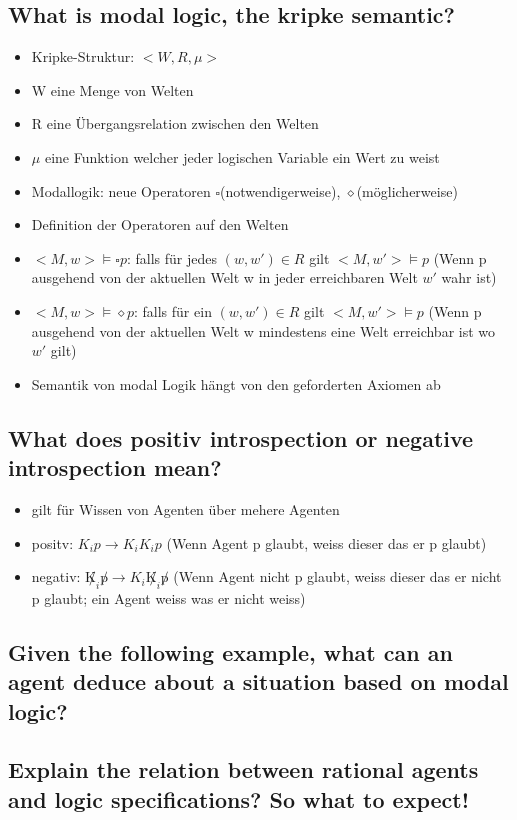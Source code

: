 \subsection{What is modal logic, the kripke semantic?}
\begin{itemize}
	\item Kripke-Struktur: $<W,R,\mu>$
	\item W eine Menge von Welten
	\item R eine Übergangsrelation zwischen den Welten
	\item $\mu$ eine Funktion welcher jeder logischen Variable ein Wert zu weist
	\item Modallogik: neue Operatoren $\square$(notwendigerweise), $\diamond$(möglicherweise)
	\item Definition der Operatoren auf den Welten
	\item $<M,w>\vDash\square p$: falls für jedes $(w,w') \in R$ gilt $<M,w'> \vDash p$ (Wenn p ausgehend von der aktuellen Welt w  in jeder erreichbaren Welt $w'$ wahr ist)
	\item $<M,w>\vDash\diamond p$: falls für ein $(w,w') \in R$ gilt $<M,w'> \vDash p$ (Wenn p ausgehend von der aktuellen Welt w mindestens eine Welt erreichbar ist wo $w'$ gilt)
	\item Semantik von modal Logik hängt von den geforderten Axiomen ab
	\end{itemize}
\subsection{What does positiv introspection or negative introspection mean?}
\begin{itemize}
	\item gilt für Wissen von Agenten über mehere Agenten
	\item positv: $K_i p \rightarrow K_i K_i p$ (Wenn Agent p glaubt, weiss dieser das er p glaubt)
	\item negativ: $\not K_i \not p \rightarrow K_i \not K_i \not p$ (Wenn Agent nicht p glaubt, weiss dieser das er  nicht p glaubt; ein Agent weiss was er nicht weiss)
\end{itemize}
\subsection{Given the following example, what can an agent deduce about a situation based on modal logic?}
\subsection{Explain the relation between rational agents and logic specifications? So what to expect!}
